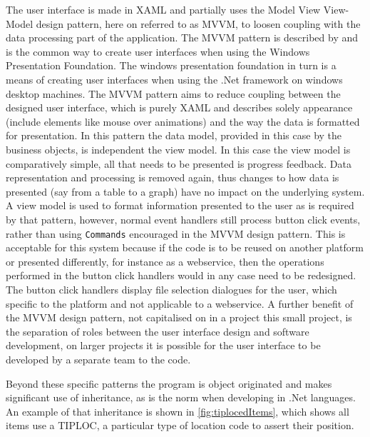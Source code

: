  The user interface is made in XAML and partially uses the Model View View-Model design pattern, here on referred to as MVVM, to loosen coupling with the data processing part of the application. The MVVM pattern is described by \citet{Microsoft2012} and is the common way to create user interfaces when using the Windows Presentation Foundation. The windows presentation foundation in turn is a means of creating user interfaces when using the .Net framework on windows desktop machines. The MVVM pattern aims to reduce coupling between the designed user interface, which is purely XAML and describes solely appearance (include elements like mouse over animations) and the way the data is formatted for presentation. In this pattern the data model, provided in this case by the business objects, is independent the view model. In this case the view model is comparatively simple, all that needs to be presented is progress feedback. Data representation and processing is removed again, thus changes to how data is presented (say from a table to a graph) have no impact on the underlying system. A view model is used to format information presented to the user as is required by that pattern, however, normal event handlers still process button click events, rather than using \lstinline{Commands} encouraged in the MVVM design pattern. This is acceptable for this system because if the code is to be reused on another platform or presented differently, for instance as a webservice, then the operations performed in the button click handlers would in any case need to be redesigned. The button click handlers display file selection dialogues for the user, which specific to the platform and not applicable to a webservice. A further benefit of the MVVM design pattern, not capitalised on in a project this small project, is the separation of roles between the user interface design and software development, on larger projects it is possible for the user interface to be developed by a separate team to the code.

 Beyond these specific patterns the program is object originated and makes significant use of inheritance, as is the norm when developing in .Net languages. An example of that inheritance is shown in \autoref{fig:tiplocedItems}, which shows all items use a TIPLOC, a particular type of location code to assert their position. 

